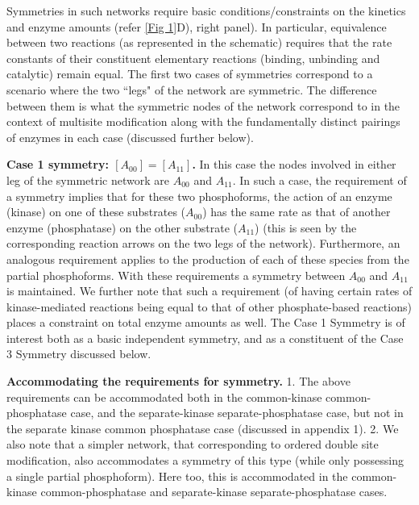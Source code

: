 \documentclass[9pt,lineno]{elife}
\begin{document}
Symmetries in such networks require basic conditions/constraints on the kinetics and enzyme amounts (refer \cref{Fig 1}D), right panel). %
In particular, equivalence between two reactions (as represented in the schematic) requires that the rate constants of their constituent elementary reactions (binding, unbinding and catalytic) remain equal.  
The first two cases of symmetries correspond to a scenario where  the two ``legs" of the network are symmetric. The  difference between them is what the symmetric  nodes of the network correspond to in the context of multisite modification along with the fundamentally distinct pairings of enzymes in each case (discussed further below).

{\bf Case 1 symmetry: $[A_{00}]=[A_{11}]$.} In this case the nodes involved in either leg of the symmetric network are $A_{00}$ and $A_{11}$. In such a case, the requirement of a symmetry implies that  for these two phosphoforms, the action of an enzyme (kinase) on one of these substrates ($A_{00}$) has the same rate as that of another enzyme (phosphatase) on the other substrate ($A_{11}$)
(this is seen by  the corresponding reaction arrows on the two legs of the network). Furthermore, an analogous requirement applies to the production of each of these species from the partial phosphoforms. With these requirements a symmetry between $A_{00}$ and $A_{11}$ is maintained. 
We further note that such a requirement (of having certain rates of kinase-mediated reactions being equal to that of other phosphate-based reactions) places a constraint on total enzyme amounts as well.
The Case 1 Symmetry is of interest both as a basic independent symmetry, and as a constituent of the Case 3 Symmetry discussed below.

{\bf Accommodating the requirements for symmetry.} 1. The above requirements can be accommodated both in the common-kinase common-phosphatase case, and the separate-kinase separate-phosphatase case, but not in the separate kinase common phosphatase case (discussed in appendix 1). 2. We also note that a simpler network, that corresponding to ordered double site modification, also accommodates a symmetry of this type (while only possessing a single partial phosphoform). Here too, this is accommodated in the common-kinase common-phosphatase and 
separate-kinase separate-phosphatase cases.
\end{document}
